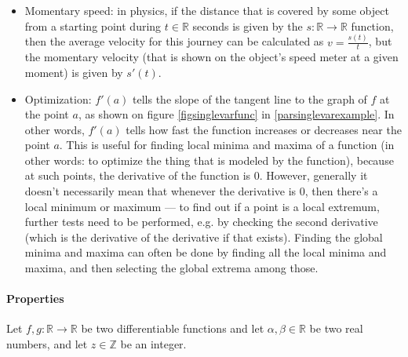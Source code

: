 \documentclass{article}
\begin{document}
            \begin{itemize}
              \item Momentary speed: in physics, if the distance that is covered
                    by some object from a starting point during
                    $t \in \mathbb{R}$ seconds is given by the
                    $s : \mathbb{R} \rightarrow \mathbb{R}$ function, then the
                    average velocity for this journey can be calculated as
                    $v = \frac{s(t)}{t}$, but the momentary velocity (that is
                    shown on the object's speed meter at a given moment) is
                    given by $s'(t)$.

              \item Optimization: $f'(a)$ tells the slope of the tangent line to
                    the graph of $f$ at the point $a$, as shown on figure
                    \ref{figsinglevarfunc} in \ref{parsinglevarexample}. In
                    other words, $f'(a)$ tells how fast the function increases
                    or decreases near the point $a$. This is useful for finding
                    local minima and maxima of a function (in other words: to
                    optimize the thing that is modeled by the function),
                    because at such points, the derivative of the function is
                    $0$. However, generally it doesn't necessarily mean that
                    whenever the derivative is $0$, then there's a local
                    minimum or maximum --- to find out if a point is a local
                    extremum, further tests need to be performed, e.g. by
                    checking the second derivative (which is the derivative of
                    the derivative if that exists).  Finding the global minima
                    and maxima can often be done by finding all the local
                    minima and maxima, and then selecting the global extrema
                    among those.
            \end{itemize}

          \paragraph{Properties}

            Let $f, g : \mathbb{R} \rightarrow \mathbb{R}$ be two differentiable
            functions and let $\alpha, \beta \in \mathbb{R}$ be two real
            numbers, and let $z \in \mathbb{Z}$ be an integer.
\end{document}
